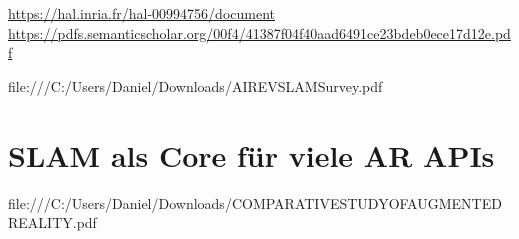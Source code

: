 \url{https://hal.inria.fr/hal-00994756/document}
\url{https://pdfs.semanticscholar.org/00f4/41387f04f40aad6491ce23bdeb0ece17d12e.pdf}


file:///C:/Users/Daniel/Downloads/AIREVSLAMSurvey.pdf


\section{SLAM als Core für viele AR APIs}

file:///C:/Users/Daniel/Downloads/COMPARATIVESTUDYOFAUGMENTEDREALITY.pdf
